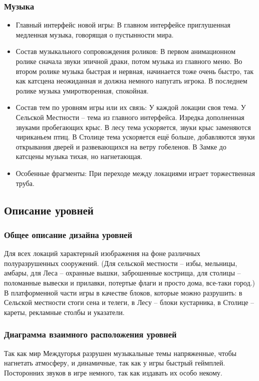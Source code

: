 \documentclass{article}
\begin{document}
\subsubsection{Музыка}
\begin{itemize}
    \item Главный интерфейс новой игры: В главном интерфейсе приглушенная медленная музыка, говорящая о пустынности мира.
    \item Состав музыкального сопровождения роликов: В первом анимационном ролике сначала звуки эпичной драки, потом музыка из главного меню.
    Во втором ролике музыка быстрая и нервная, начинается тоже очень быстро, так как катсцена неожиданная и должна немного напугать игрока.
    В последнем ролике музыка умиротворенная, спокойная.
    \item Состав тем по уровням игры или их связь: У каждой локации своя тема. У Сельской Местности – тема из главного интерфейса. Изредка дополненная звуками пробегающих крыс. В лесу тема ускоряется, звуки крыс заменяются чириканьем птиц. В Столице тема ускоряется ещё больше, добавляются звуки открывания дверей и развевающихся на ветру гобеленов. В Замке до катсцены музыка тихая, но нагнетающая.
    \item Особенные фрагменты: При переходе между локациями играет торжественная труба. 
\end{itemize}

\subsection{Описание уровней}
\subsubsection{Общее описание дизайна уровней}
Для всех локаций характерный изображения на фоне различных полуразрушенных сооружений.
(Для сельской местности – избы, мельницы, амбары, для Леса – охранные вышки, заброшенные кострища, для столицы – поломанные вывески и прилавки, потертые флаги и просто дома, все-таки город.)
В платформенной части игры в качестве блоков, которые можно разрушить: в Сельской местности стоги сена и телеги, в Лесу – блоки кустарника, в Столице – кареты, рекламные столбы и указатели.

\subsubsection{Диаграмма взаимного расположения уровней}
Так как мир Междугорья разрушен музыкальные темы напряженные, чтобы нагнетать атмосферу, и динамичные, так как у игры быстрый геймплей. Посторонних звуков в игре немного, так как издавать их особо некому.
\end{document}
